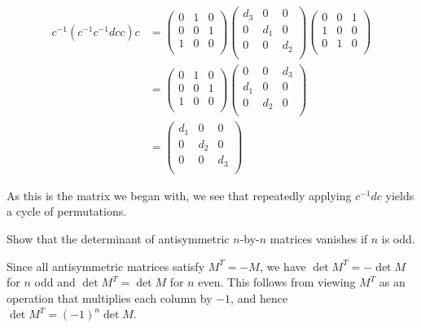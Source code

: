 \documentclass[../group-theory-in-a-nutshell-for-physicists.tex]{subfiles}
\begin{document}
\begin{questions}
\begin{solution}
\begin{align*}
c^{-1}(c^{-1}c^{- 1}dcc)c&= \begin{pmatrix}
0 & 1 & 0 \\
0 & 0 & 1 \\
1 & 0 & 0 \\
\end{pmatrix}\begin{pmatrix}
d_{3} & 0 & 0 \\
0 & d_{1} & 0 \\
0 & 0 & d_{2} \\
\end{pmatrix}\begin{pmatrix}
0 & 0 & 1 \\
1 & 0 & 0 \\
0 & 1 & 0 \\
\end{pmatrix} \\
&= \begin{pmatrix}
0 & 1 & 0 \\
0 & 0 & 1 \\
1 & 0 & 0 \\
\end{pmatrix}\begin{pmatrix}
0 & 0 & d_{3} \\
d_{1} & 0 & 0 \\
0 & d_{2} & 0 \\
\end{pmatrix} \\
&= \begin{pmatrix}
d_{1} & 0 & 0 \\
0 & d_{2} & 0 \\
0 & 0 & d_{3} \\
\end{pmatrix}
\end{align*}

As this is the matrix we began with, we see that repeatedly applying
$c^{- 1}dc$ yields a cycle of permutations.
\end{solution}

\question Show that the determinant of antisymmetric $n$-by-$n$ matrices
vanishes if $n$ is odd.

\begin{solution}
Since all antisymmetric matrices satisfy $M^{T} = {-M}$, we have
$\det M^{T} = {-\det M}$ for $n$ odd and $\det M^{T} = \det M$
for $n$ even. This follows from viewing $M^{T}$ as an operation
that multiplies each column by ${-1}$, and hence $\det M^T = (-1)^n\det{M}$.


\end{solution}
\end{questions}
\end{document}
